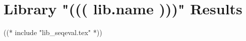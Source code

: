 \section{Library "((( lib.name )))" Results}
\label{lib:(((lib.name)))}

((* include "lib_seqeval.tex" *))

